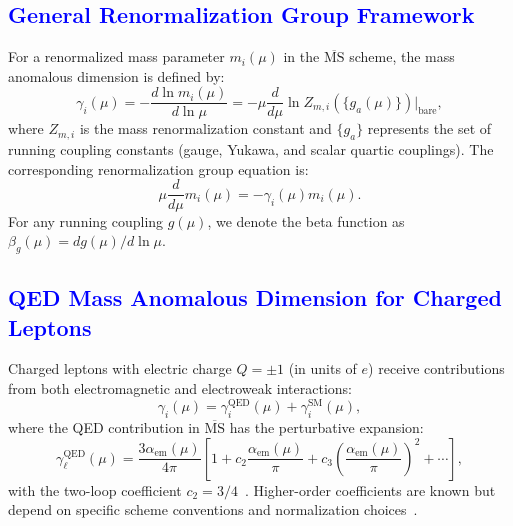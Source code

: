 \documentclass[%
amsmath,amssymb,
aps,
prb,
floatfix, showkeys, 10pt,
]{revtex4-2}
\newcommand{\modif}[1]{\textcolor{blue}{#1}}
\begin{document}
{\modif{  \subsection{General Renormalization Group Framework}
\label{subsec:rg_framework}   }}
For a renormalized mass parameter $m_i(\mu)$ in the $\overline{\text{MS}}$ scheme, the mass anomalous dimension is defined by:
\begin{equation}
\gamma_i(\mu) = -\frac{d\ln m_i(\mu)}{d\ln\mu} = -\mu \frac{d}{d\mu}\ln Z_{m,i}(\{g_a(\mu)\})\Big|_{\text{bare}},
\label{eq:gamma_definition}
\end{equation}
where $Z_{m,i}$ is the mass renormalization constant and $\{g_a\}$ represents the set of running coupling constants (gauge, Yukawa, and scalar quartic couplings). The corresponding renormalization group equation is:
\begin{equation}
\mu \frac{d}{d\mu} m_i(\mu) = -\gamma_i(\mu) m_i(\mu).
\label{eq:mass_rge}
\end{equation}
For any running coupling $g(\mu)$, we denote the beta function as $\beta_g(\mu) = dg(\mu)/d\ln\mu$.









{\modif{ \subsection{QED Mass Anomalous Dimension for Charged Leptons}
\label{subsec:qed_anomalous}  }}
Charged leptons with electric charge $Q = \pm 1$ (in units of $e$) receive contributions from both electromagnetic and electroweak interactions:
\begin{equation}
\gamma_i(\mu) = \gamma_i^{\text{QED}}(\mu) + \gamma_i^{\text{SM}}(\mu),
\label{eq:lepton_gamma_split}
\end{equation}
where the QED contribution in $\overline{\text{MS}}$ has the perturbative expansion:
\begin{equation}
\gamma_\ell^{\text{QED}}(\mu) = \frac{3\alpha_{\text{em}}(\mu)}{4\pi}\left[1 + c_2 \frac{\alpha_{\text{em}}(\mu)}{\pi} + c_3 \left(\frac{\alpha_{\text{em}}(\mu)}{\pi}\right)^2 + \cdots\right],
\label{eq:qed_gamma_expansion}
\end{equation}
with the two-loop coefficient $c_2 = 3/4$~\cite{Tarrach1981}. Higher-order coefficients are known but depend on specific scheme conventions and normalization choices~\cite{ChetyrkinKuehnSteinhauser2000,HerrenSteinhauser2018}.
\end{document}
